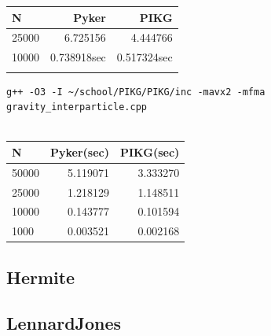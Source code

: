 \documentclass[ams, a4j]{U-AizuGT}
\begin{document}
\begin{tabular}{|l|r|r|} \hline
  N & Pyker & PIKG \\ \hline
  25000 & 6.725156 & 4.444766 \\
  10000 & 0.738918sec & 0.517324sec \\
 \\ \hline
\end{tabular}


\begin{lstlisting}[frame=single, caption=Nbody-kernel.pikg, label=Nbody-kernel.pikg]
  g++ -O3 -I ~/school/PIKG/PIKG/inc -mavx2 -mfma gravity_interparticle.cpp
  
  \end{lstlisting}



  \begin{tabular}{|l|r|r|} \hline
    N & Pyker(sec) & PIKG(sec) \\ \hline
    50000 & 5.119071 & 3.333270\\
    25000 & 1.218129 & 1.148511 \\
    10000 & 0.143777 & 0.101594 \\
    1000 &  0.003521 & 0.002168 \\ \hline
  \end{tabular}
  

\subsection{Hermite}



\subsection{LennardJones}
\end{document}

